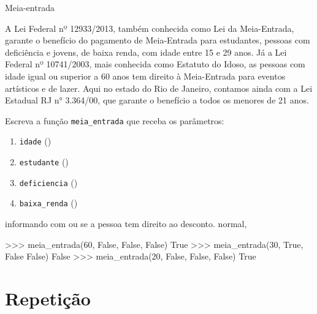 	\begin{problem}{Meia-entrada}%
		
	A Lei Federal nº 12933/2013, também conhecida como Lei da Meia-Entrada, garante o benefício do pagamento de Meia-Entrada para estudantes, pessoas com deficiência e jovens, de baixa renda, com idade entre 15 e 29 anos. Já a Lei Federal nº 10741/2003, mais conhecida como Estatuto do Idoso, as pessoas com idade igual ou superior a 60 anos tem direito à Meia-Entrada para eventos artísticos e de lazer. Aqui no estado do Rio de Janeiro, contamos ainda com a Lei Estadual RJ n° 3.364/00, que garante o benefício a todos os menores de 21 anos. \par
	
	\proposal Escreva a função \texttt{meia\_entrada} que receba os parâmetros:
	\begin{enumerate} 
		\item \texttt{idade} ()
		\item \texttt{estudante} ()
		\item \texttt{deficiencia} ()
		\item \texttt{baixa\_renda} ()
	\end{enumerate}
	informando com  ou  se a pessoa tem direito ao desconto. normal,
    
	\begin{lstpython}
    >>> meia_entrada(60, False, False, False)
    True
    >>> meia_entrada(30, True, False False)
    False
    >>> meia_entrada(20, False, False, False)
    True
	\end{lstpython}
	\end{problem}


	\section*{Repetição}

